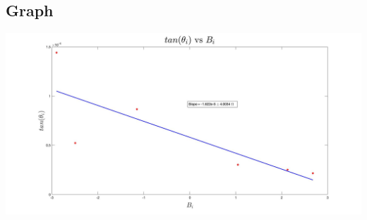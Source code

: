 \documentclass{article}
\begin{document}
\begin{center}
  \subsection*{Graph}
  \includegraphics[scale=0.25]{graph.jpg}
\end{center}
\end{document}

